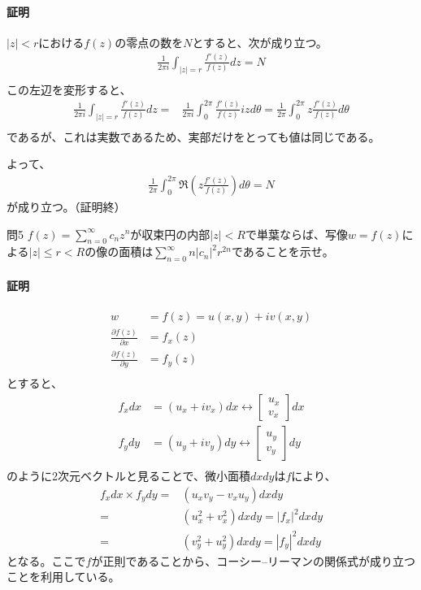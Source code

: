 \paragraph{証明}
$|z|<r$における$f(z)$の零点の数を$N$とすると、次が成り立つ。
\begin{align*}
    \frac{1}{2\pi i}\int_{|z|=r}\frac{f'(z)}{f(z)}dz=N\\
\end{align*}
この左辺を変形すると、
\begin{align*}
    \frac{1}{2\pi i}\int_{|z|=r}\frac{f'(z)}{f(z)}dz
    =&\frac{1}{2\pi i}\int_{0}^{2\pi}\frac{f'(z)}{f(z)}izd\theta
    =\frac{1}{2\pi}\int_{0}^{2\pi}z\frac{f'(z)}{f(z)}d\theta\\
\end{align*}
であるが、これは実数であるため、実部だけをとっても値は同じである。

よって、
\begin{align*}
    \frac{1}{2\pi}\int_{0}^{2\pi}\Re\left(z\frac{f'(z)}{f(z)}\right)d\theta=N
\end{align*}
が成り立つ。（証明終）

\newpage
\begin{mysimplebox}{問5}
    $f(z)=\sum_{n=0}^{\infty}c_nz^n$が収束円の内部$|z|<R$で単葉ならば、写像$w=f(z)$による$|z|\le r<R$の像の面積は$\sum_{n=0}^{\infty}n|c_n|^2r^{2n}$であることを示せ。
\end{mysimplebox}
\paragraph{証明}
\begin{align*}
    w&=f(z)=u(x,y)+iv(x,y)\\
    \frac{\partial f(z)}{\partial x}&=f_x(z)\\
    \frac{\partial f(z)}{\partial y}&=f_y(z)\\
\end{align*}
とすると、
\begin{align*}
    f_xdx&=(u_x+iv_x)dx\leftrightarrow
    \begin{bmatrix}
        u_x\\v_x
    \end{bmatrix}dx\\
    f_ydy&=(u_y+iv_y)dy\leftrightarrow
    \begin{bmatrix}
        u_y\\v_y
    \end{bmatrix}dy\\
\end{align*}
のように2次元ベクトルと見ることで、微小面積$dxdy$は$f$により、
\begin{align*}
    f_xdx\times f_ydy
    =&(u_xv_y-v_xu_y)dxdy\\
    =&(u_x^2+v_x^2)dxdy=|f_x|^2dxdy\\
    =&(v_y^2+u_y^2)dxdy=|f_y|^2dxdy
\end{align*}
となる。ここで$f$が正則であることから、コーシー--リーマンの関係式が成り立つことを利用している。

